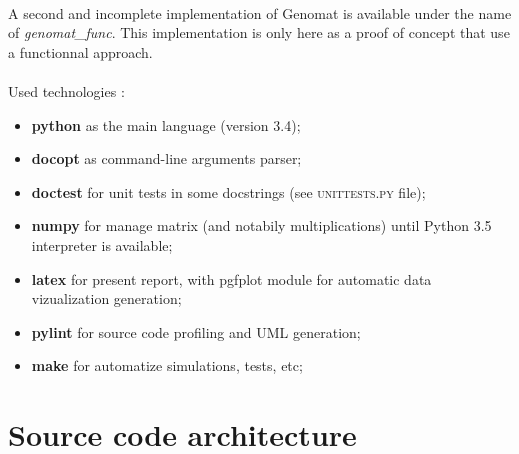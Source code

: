 \documentclass[]{report} %
\begin{document}
	\paragraph*{}
        A second and incomplete implementation of Genomat is available under the name of \textit{genomat\_func}. 
        This implementation is only here as a proof of concept that use a functionnal approach.

	\paragraph*{}
        Used technologies :
        \begin{itemize}
                \item \textbf{python} as the main language (version 3.4);
                \item \textbf{docopt} as command-line arguments parser;
                \item \textbf{doctest} for unit tests in some docstrings (see \textsc{unittests.py} file);
                \item \textbf{numpy} for manage matrix (and notabily multiplications) until Python 3.5 interpreter is available;
                \item \textbf{latex} for present report, with pgfplot module for automatic data vizualization generation;
                \item \textbf{pylint} for source code profiling and UML generation;
                \item \textbf{make} for automatize simulations, tests, etc;
        \end{itemize}





\section*{Source code architecture}
\end{document}
